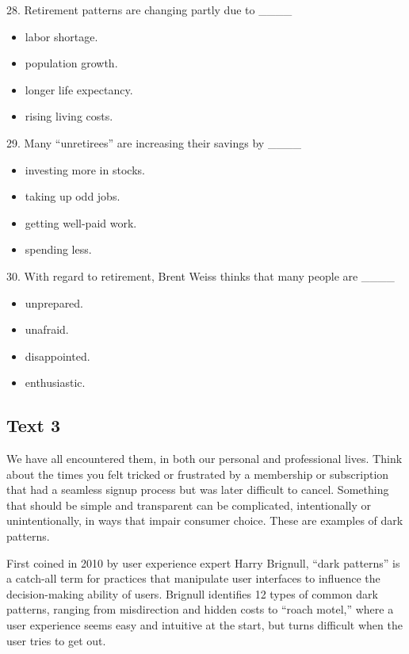 \documentclass[UTF8,11pt]{ctexart}
\begin{document}
28. Retirement patterns are changing partly due to \_\_\_\_


\begin{itemize}[leftmargin=2em,itemsep=.2em,topsep=.4em]\item[A.] labor shortage.
\item[B.] population growth.
\item[C.] longer life expectancy.
\item[D.] rising living costs.
\end{itemize}

29. Many “unretirees” are increasing their savings by \_\_\_\_


\begin{itemize}[leftmargin=2em,itemsep=.2em,topsep=.4em]\item[A.] investing more in stocks.
\item[B.] taking up odd jobs.
\item[C.] getting well-paid work.
\item[D.] spending less.
\end{itemize}

30. With regard to retirement, Brent Weiss thinks that many people are \_\_\_\_


\begin{itemize}[leftmargin=2em,itemsep=.2em,topsep=.4em]\item[A.] unprepared.
\item[B.] unafraid.
\item[C.] disappointed.
\item[D.] enthusiastic.
\end{itemize}

\subsection*{\textbf{Text 3}}


We have all encountered them, in both our personal and professional lives. Think about the times you felt tricked or frustrated by a membership or subscription that had a seamless signup process but was later difficult to cancel. Something that should be simple and transparent can be complicated, intentionally or unintentionally, in ways that impair consumer choice. These are examples of dark patterns.


First coined in 2010 by user experience expert Harry Brignull, “dark patterns” is a catch-all term for practices that manipulate user interfaces to influence the decision-making ability of users. Brignull identifies 12 types of common dark patterns, ranging from misdirection and hidden costs to “roach motel,” where a user experience seems easy and intuitive at the start, but turns difficult when the user tries to get out.
\end{document}
